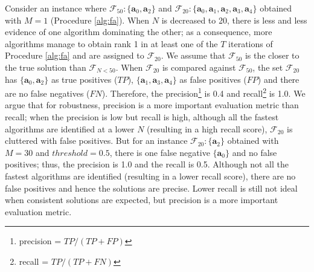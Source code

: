 \documentclass[conference]{IEEEtran}
\begin{document}
Consider an instance where $\mathcal{F}_{50}:\{\mathbf{a}_0,\mathbf{a}_2\}$ and $\mathcal{F}_{20}:\{\mathbf{a}_0,\mathbf{a}_1,\mathbf{a}_2,\mathbf{a}_3,\mathbf{a}_4\}$ obtained with $M=1$ (Procedure \ref{alg:fa}). When $N$ is decreased to 20, there is less and less evidence of one algorithm dominating the other; as a consequence, more algorithms manage to obtain rank 1 in at least one of the $T$ iterations of Procedure \ref{alg:fa} and are assigned to $\mathcal{F}_{20}$.  We assume that $\mathcal{F}_{50}$ is the closer to the true solution than $\mathcal{F}_{N<50}$. When $\mathcal{F}_{20}$ is compared against $\mathcal{F}_{50}$, the set $\mathcal{F}_{20}$ has  $\{\mathbf{a}_0,\mathbf{a}_2\}$ as true positives ($TP$), $\{\mathbf{a}_1,\mathbf{a}_3,\mathbf{a}_4\}$  as false positives ($FP$) and there are no false negatives ($FN$). Therefore, the precision\footnote{precision = $TP/(TP+FP)$} is 0.4 and recall\footnote{recall = $TP/(TP+FN)$} is 1.0. We argue that for robustness, precision is a more important evaluation metric than recall; when the precision is low but recall is high, although all the fastest algorithms are identified at a lower $N$ (resulting in a high recall score), $\mathcal{F}_{20}$ is cluttered with false positives. But for an instance $\mathcal{F}_{20} : \{\mathbf{a}_2\}$ obtained with $M=30$ and $threshold=0.5$, there is one false negative $\{\mathbf{a}_0\}$ and no false positives; thus, the precision is 1.0 and the recall is 0.5. Although not all the fastest algorithms are identified (resulting in a lower recall score), there are no false positives and hence the solutions are precise. Lower recall is still not ideal when consistent solutions are expected, but precision is a more important evaluation metric. 
\end{document}
